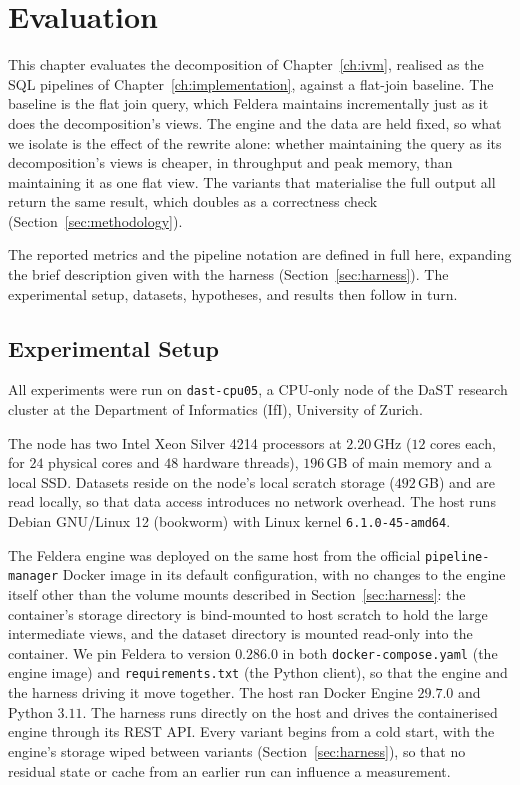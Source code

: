 \chapter{Evaluation}
\label{ch:evaluation}

This chapter evaluates the decomposition of Chapter~\ref{ch:ivm}, realised as the SQL pipelines of Chapter~\ref{ch:implementation}, against a flat-join baseline.
The baseline is the flat join query, which Feldera maintains incrementally just as it does the decomposition's views.
The engine and the data are held fixed, so what we isolate is the effect of the rewrite alone: whether maintaining the query as its decomposition's views is cheaper, in throughput and peak memory, than maintaining it as one flat view. The variants that materialise the full output all return the same result, which doubles as a correctness check (Section~\ref{sec:methodology}).

The reported metrics and the pipeline notation are defined in full here, expanding the brief description given with the harness (Section~\ref{sec:harness}). The experimental setup, datasets, hypotheses, and results then follow in turn.

\section{Experimental Setup}
\label{sec:setup}

All experiments were run on \texttt{dast-cpu05}, a CPU-only node of the DaST research cluster at the Department of Informatics (IfI), University of Zurich.

The node has two Intel Xeon Silver 4214 processors at $2.20$\,GHz ($12$ cores each, for $24$ physical cores and $48$ hardware threads), $196$\,GB of main memory and a local SSD. Datasets reside on the node's local scratch storage ($492$\,GB) and are read locally, so that data access introduces no network overhead. The host runs Debian GNU/Linux 12 (bookworm) with Linux kernel \texttt{6.1.0-45-amd64}.

The Feldera engine was deployed on the same host from the official \texttt{pipeline-manager} Docker image in its default configuration, with no changes to the engine itself other than the volume mounts described in Section~\ref{sec:harness}: the container's storage directory is bind-mounted to host scratch to hold the large intermediate views, and the dataset directory is mounted read-only into the container. We pin Feldera to version $0.286.0$ in both \texttt{docker-compose.yaml} (the engine image) and \texttt{requirements.txt} (the Python client), so that the engine and the harness driving it move together. The host ran Docker Engine $29.7.0$ and Python $3.11$. The harness runs directly on the host and drives the containerised engine through its REST API. Every variant begins from a cold start, with the engine's storage wiped between variants (Section~\ref{sec:harness}), so that no residual state or cache from an earlier run can influence a measurement.

